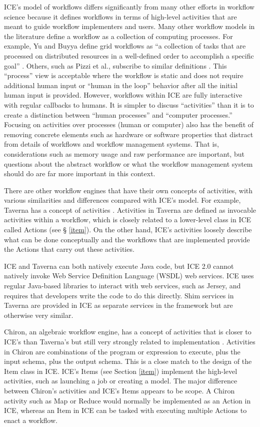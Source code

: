 ICE's model of workflows differs significantly from many other
efforts in workflow science because it defines workflows in terms of high-level
activities that are meant to guide workflow implementers and users. Many other
workflow models in the literature define a workflow as a collection of
computing processes. For example, Yu and Buyya define grid workflows as ``a
collection of tasks that are processed on distributed resources in a
well-defined order to accomplish a specific goal'' \cite{yu_taxonomy_2005}.
Others, such as Pizzi et al., subscribe to similar definitions
\cite{pizzi_aiida:_2016}. This ``process'' view is acceptable where the
workflow is static and does not require additional human input or ``human in
the loop'' behavior after all the initial human input is provided. However,
workflows within ICE are fully interactive with regular callbacks to humans. It
is simpler to discuss ``activities'' than it is to create a distinction between
``human processes'' and ``computer processes.'' Focusing on activities over
processes (human or computer) also has the benefit of removing concrete
elements such as hardware or software properties that distract from details of
workflows and workflow management systems. That is, considerations such as
memory usage and raw performance are important, but questions about the
abstract workflow or what the workflow management system should do are far more
important in this context.

There are other workflow engines that have their own concepts of activities,
with various similarities and differences compared with ICE's model. For
example, Taverna has a concept of activities \cite{wolstencroft_taverna_2013}.
Activities in Taverna are defined as invocable activities within a workflow,
which is closely related to a lower-level class in ICE called Actions (see \S
\ref{item}). On the other hand, ICE's activities loosely describe what can be
done conceptually and the workflows that are implemented provide the Actions
that carry out these activities.

ICE and Taverna can both natively execute Java code, but ICE 2.0 cannot
natively invoke Web Service Definition Language (WSDL) web services. ICE uses
regular Java-based libraries to interact with web services, such as Jersey, and
requires that developers write the code to do this directly. Shim services in
Taverna are provided in ICE as separate services in the framework but are
otherwise very similar.

Chiron, an algebraic workflow engine, has a concept of activities that is
closer to ICE's than Taverna's but still very strongly related to
implementation \cite{ogasawara_chiron_2014}. Activities in Chiron are
combinations of the program or expression to execute, plus the input schema,
plus the output schema. This is a close match to the design of the Item class
in ICE. ICE's Items (see Section \ref{item}) implement the high-level
activities, such as launching a job or creating a model. The major difference
between Chiron's activities and ICE's Items appears to be scope. A Chiron
activity such as Map or Reduce would normally be implemented as an Action in
ICE, whereas an Item in ICE can be tasked with executing multiple Actions to
enact a workflow.

